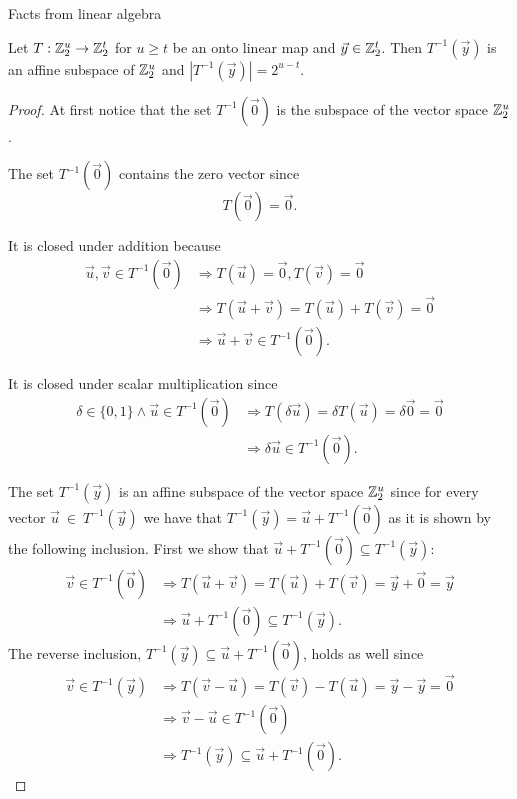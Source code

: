 \begin{chapter}{Facts from linear algebra}
\begin{lemma}
\label{lemma-linear-transformation-domain-distribution}
Let $T: \mathbb{Z}_{2}^{u} \rightarrow \mathbb{Z}_{2}^{t}$ for $u \geq t$ be an onto linear map and $\vec{y} \in \mathbb{Z}_{2}^{t}$. Then $T^{-1}(\vec{y})$ is an affine subspace of $\mathbb{Z}_{2}^{u}$ and $|T^{-1}(\vec{y})| = 2 ^ {u - t}$.
\end{lemma}
\begin{proof}
At first notice that the set $T^{-1}(\vec{0})$ is the subspace of the vector space $\mathbb{Z}_{2}^{u}$.

The set $T^{-1}(\vec{0})$ contains the zero vector since
\[ 
	T(\vec{0}) = \vec{0} \text{.} 
\]

It is closed under addition because
\[
\begin{split}
\vec{u}, \vec{v} \in T^{-1}(\vec{0}) 
	& \Rightarrow T(\vec{u}) = \vec{0}, T(\vec{v}) = \vec{0} \\ 
	& \Rightarrow T(\vec{u} + \vec{v}) = T(\vec{u}) + T(\vec{v}) = \vec{0} \\ 
	& \Rightarrow \vec{u} + \vec{v} \in T^{-1}(\vec{0}) \text{.}
\end{split}
\]

It is closed under scalar multiplication since
\[
\begin{split}
\delta \in \{0, 1\} \wedge \vec{u} \in T^{-1}(\vec{0}) 
	& \Rightarrow T(\delta \vec{u}) = \delta T(\vec{u}) = \delta \vec{0} = \vec{0} \\
	& \Rightarrow \delta \vec{u} \in T^{-1}(\vec{0}) \text{.}
\end{split}
\]

The set $T^{-1}(\vec{y})$ is an affine subspace of the vector space $\mathbb{Z}_{2}^{u}$ since for every vector $\vec{u}~\in~T^{-1}(\vec{y})$ we have that $T^{-1}(\vec{y}) = \vec{u} + T^{-1}(\vec{0})$ as it is shown by the following inclusion. First we show that $\vec{u} + T^{-1}(\vec{0}) \subseteq T^{-1}(\vec{y})$:
\[
\begin{split}
\vec{v} \in T^{-1}(\vec{0}) 
	& \Rightarrow T(\vec{u} + \vec{v}) = T(\vec{u}) + T(\vec{v}) = \vec{y} + \vec{0} = \vec{y}  \\
	& \Rightarrow \vec{u} + T^{-1}(\vec{0}) \subseteq T^{-1}(\vec{y}) \text{.}
\end{split}
\]
The reverse inclusion, $T^{-1}(\vec{y}) \subseteq \vec{u} + T^{-1}(\vec{0})$, holds as well since
\[
\begin{split}
\vec{v} \in T^{-1}(\vec{y}) 
	& \Rightarrow T(\vec{v} - \vec{u}) = T(\vec{v}) - T(\vec{u}) = \vec{y} - \vec{y} = \vec{0} \\
	& \Rightarrow \vec{v} - \vec{u} \in T^{-1}(\vec{0}) \\
	& \Rightarrow T^{-1}(\vec{y}) \subseteq \vec{u} + T^{-1}(\vec{0}) \text{.}
\end{split}
\]


\end{proof}
\end{chapter}
